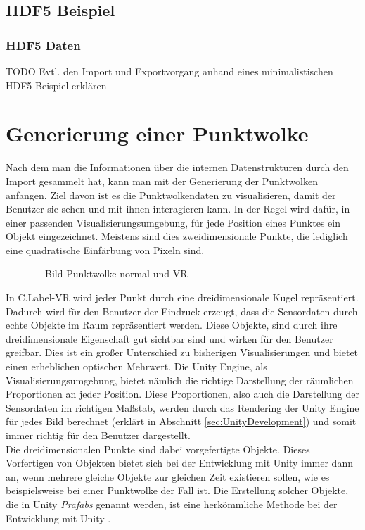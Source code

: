 \subsection{HDF5 Beispiel}
\label{sec:HDF5Example}

\subsubsection{HDF5 Daten}
\label{sec:HDF5}
TODO Evtl. den Import und Exportvorgang anhand eines minimalistischen HDF5-Beispiel erklären

\section{Generierung einer Punktwolke}
\label{sec:Generierung}
Nach dem man die Informationen über die internen Datenstrukturen durch den Import gesammelt hat, kann man mit der Generierung der Punktwolken anfangen. Ziel davon ist es die Punktwolkendaten zu visualisieren, damit der Benutzer sie sehen und mit ihnen interagieren kann. In der Regel wird dafür, in einer passenden Visualisierungsumgebung, für jede Position eines Punktes ein Objekt eingezeichnet. Meistens sind dies zweidimensionale Punkte, die lediglich eine quadratische Einfärbung von Pixeln sind. 

------------Bild Punktwolke normal und VR-------------

In C.Label-VR wird jeder Punkt durch eine dreidimensionale Kugel repräsentiert. Dadurch wird für den Benutzer der Eindruck erzeugt, dass die Sensordaten durch echte Objekte im Raum repräsentiert werden. Diese Objekte, sind durch ihre dreidimensionale Eigenschaft gut sichtbar sind und wirken für den Benutzer greifbar. Dies ist ein großer Unterschied zu bisherigen Visualisierungen und bietet einen erheblichen optischen Mehrwert. Die Unity Engine, als Visualisierungsumgebung, bietet nämlich die richtige Darstellung der räumlichen Proportionen an jeder Position. Diese Proportionen, also auch die Darstellung der Sensordaten im richtigen Maßstab, werden durch das Rendering der Unity Engine für jedes Bild berechnet (erklärt in Abschnitt \ref{sec:UnityDevelopment}) und somit immer richtig für den Benutzer dargestellt.\\

Die dreidimensionalen Punkte sind dabei vorgefertigte Objekte. Dieses Vorfertigen von Objekten bietet sich bei der Entwicklung mit Unity immer dann an, wenn mehrere gleiche Objekte zur gleichen Zeit existieren sollen, wie es beispielsweise bei einer Punktwolke der Fall ist. Die Erstellung solcher Objekte, die in Unity \textit{Prafabs} genannt werden, ist eine herkömmliche Methode bei der Entwicklung mit Unity \cite{bib:UnityPrefab}.\\ 


